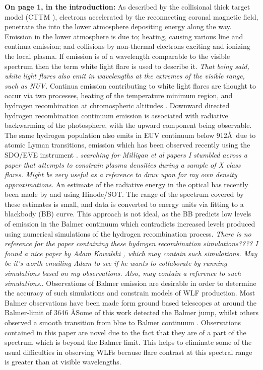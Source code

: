 \documentclass[11pt]{article}
\begin{document}
\textbf{On page 1, in the introduction: } As described by the collisional thick target model (CTTM \cite{1971SoPh...18..489B}), electrons accelerated by the reconnecting coronal magnetic field, penetrate the into the lower atmosphere depositing energy along the way. Emission in the lower atmosphere is due to; heating, causing various line and continua emission; and collisions by non-thermal electrons exciting and ionizing the local plasma. If emission is of a wavelength comparable to the visible spectrum then the term white light flare is used to describe it. \emph{That being said, white light flares also emit in wavelengths at the extremes of the visible range, such as NUV.} Continua emission contributing to white light flares are thought to occur via two processes, heating of the temperature minimum region, and hydrogen recombination at chromospheric altitudes \cite{2007ASPC..368..417D}. Downward directed hydrogen recombination continuum emission is associated with radiative backwarming of the photosphere, with the upward component being observable. The same hydrogen population also emits in EUV continuum below 912\AA\ due to atomic Lyman transitions, emission which has been observed recently using the SDO/EVE instrument \citep{2012ApJ...748L..14M, 2014ApJ...793...70M}. \emph{searching for Milligan et al papers I stumbled across a paper that attempts to constrain plasma densities during a sample of X class flares. Might be very useful as a reference to draw upon for my own density approximations.} An estimate of the radiative energy in the optical has recently been made by \cite{2013ApJ...776..123W, 2014ApJ...783...98K} and \cite{2014ApJ...793...70M} using Hinode/SOT. The range of the spectrum covered by these estimates is small, and data is converted to energy units via fitting to a blackbody (BB) curve. This approach is not ideal, as the BB predicts low levels of emission in the Balmer continuum which contradicts increased levels produced using numerical simulations of the hydrogen recombination process. \emph{There is no reference for the paper containing these hydrogen recombination simulations???? I found a nice paper by Adam Kowalski \cite{2015SoPh..tmp...61K}, which may contain such simulations. May be it's worth emailing Adam to see if he wants to collaborate by running simulations based on my observations. Also, \cite{2014ApJ...793...70M} may contain a reference to such simulations.}. Observations of Balmer emission are desirable in order to determine the accuracy of such simulations and constrain models of WLF production. Most Balmer observations have been made form ground based telescopes at around the Balmer-limit of 3646 \AA\. Some of this work detected the Balmer jump, whilst others observed a smooth transition from blue \citep{1985A&A...152..165D} to Balmer continuum \citep{1989SoPh..121..261N}. Observations contained in this paper are novel due to the fact that they are of a part of the spectrum which is beyond the Balmer limit. This helps to eliminate some of the usual difficulties in observing WLFs because flare contrast at this spectral range is greater than at visible wavelengths.\\
\end{document}
